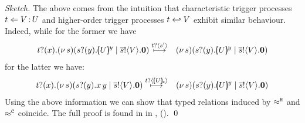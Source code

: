 \begin{proof}[Sketch]
	The above comes from the intuition that
	characteristic trigger processes
	$t \Leftarrow V{\,:\,}U$
	and
	higher-order trigger processes
	$t \hookleftarrow V$
	exhibit similar behaviour.
	Indeed, while for the former we have
	\begin{eqnarray*}
		\fotrigger{t}{x}{s}{U}{V} &\hby{\bactinp{t}{s'}}& \newsp{s}{\binp{s}{y} \mapchar{U}{y}  \Par \bout{\dual{s}}{V} \inact}
	\end{eqnarray*}
		for the latter we have:
	\begin{eqnarray*}
		\hotrigger{t}{x}{s}{V} &\hby{\bactinp{t}{\omapchar{U}}}& \newsp{s}{ \binp{s}{y} \mapchar{U}{y}  \Par \bout{\dual{s}}{V} \inact}\\
	\end{eqnarray*}
%
	Using the above information we can show that typed relations induced by 
	$\approx^\mathtt{H}$ and $\approx^\mathtt{C}$ coincide.
	The full proof is found in 
	in ,  ().
	\qed
\end{proof}

